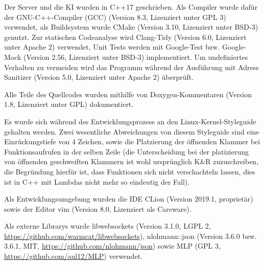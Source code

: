 Der Server und die KI wurden in C++17 geschrieben.
Als Compiler wurde dafür der GNU-C++-Compiler (GCC) (Version 8.3, Lizenziert unter GPL 3) verwendet,
als Buildsystem wurde CMake (Version 3.10, Lizenziert unter BSD-3) genutzt.
Zur statischen Codeanalyse wird Clang-Tidy (Version 6.0, Lizenziert unter Apache 2) verwendet,
Unit Tests werden mit Google-Test bzw. Google-Mock (Version 2.56, Lizenziert unter BSD-3) implementiert.
Um undefiniertes Verhalten zu vermeiden wird das Programm während der Ausführung mit Adress Sanitizer (Version 5.0, Lizenziert unter Apache 2) überprüft.

Alle Teile des Quellcodes wurden mithilfe von Doxygen-Kommentaren (Version 1.8, Lizenziert unter GPL) dokumentiert.

Es wurde sich während des Entwicklungsprozess an den Linux-Kernel-Styleguide gehalten werden. Zwei wesentliche Abweichungen von diesem Styleguide sind eine Einrückungstiefe von 4 Zeichen, sowie die Platzierung der öffnenden Klammer bei Funktionsaufrufen in der selben Zeile (die Unterscheidung bei der platizierung von öffnenden geschweiften Klammern ist wohl ursprünglich K\&R zuzuschreiben, die Begründung hierfür ist, dass Funktionen sich nicht verschachteln lassen, dies
ist in C++ mit Lambdas nicht mehr so eindeutig der Fall).

Als Entwicklungsumgebung wurden die IDE CLion (Version 2019.1, proprietär) sowie der Editor vim (Version 8.0, Lizenziert als Careware).

Als externe Librarys wurde libwebsockets (Version 3.1.0, LGPL 2, \url{https://github.com/warmcat/libwebsockets}), 
nlohmann::json (Version 3.6.0 bzw. 3.6.1, MIT, \url{https://github.com/nlohmann/json}) sowie 
MLP (GPL 3, \url{https://github.com/aul12/MLP}) verwendet.
